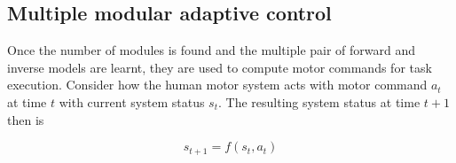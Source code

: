




\subsection{Multiple modular adaptive control}
\label{cha4:sec2:control}

Once the number of modules is found and the multiple pair of forward and inverse models are learnt, they are used to compute motor commands for task execution.
Consider how the human motor system acts with motor command $a_t$ at time $t$ with current system status $s_t$. The resulting system status at time $t+1$ then is

\begin{equation}
\label{equ:e1}
s_{t+1} = f\left(s_t,a_t\right)
\end{equation}

